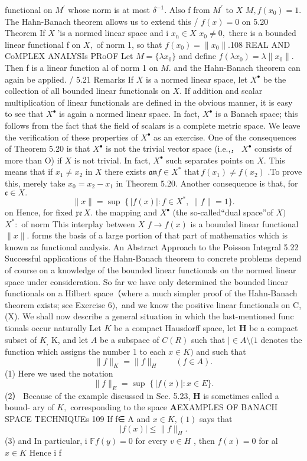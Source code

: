functional on $M^{\prime}$ whose norm is at most $\delta^{-1}.$ Also f from $M^{\prime}$ to $X$ $M,f(x_{0})=1.$ The Hahn-Banach theorem allows us to extend this / $f(x)=0$ on 5.20 Theorem If $X$ ’is a normed linear space and i $x_{\mathrm{n}}\in X$ $x_{0}\neq0,$ there is a bounded linear functional f on $X,$ of norm 1, so that $f(x_{0})=\|x_{0}\|.$108 REAL AND CoMPLEX ANALYSIs PRoOF Let $M=\{\lambda x_{0}\}$ and define $f(\lambda x_{0})=\lambda\|x_{0}\|.$ Then f is a linear function al of norm 1 on $M.$ and the Hahn-Banach theorem can again be applied. / 5.21 Remarks If $\textstyle X$ is a normed linear space, let $X^{\bullet}$ be the collection of all bounded linear functionals on $X.$ If addition and scalar multiplication of linear functionals are defined in the obvious manner, it is easy to see that $X^{\bullet}$ is again a normed linear space. In fact, $X^{\bullet}$ is a Banach space; this follows from the fact that the field of scalars is a complete metric space. We leave the verification of these properties of $X^{\bullet}$ as an exercise. One of the consequences of Theorem 5.20 is that $X^{\bullet}$ is not the trivial vector space (i.e.,， $X^{\bullet}$ consists of more than O) if $X$ is not trivial. In fact, $X^{\bullet}$ such separates points on $X.$ This means that if $x_{1}\neq x_{2}$ in $X$ there exists ${\mathfrak{a n}}f\in X^{*}$ $\mathrm{that}\,f(x_{1})\neq f(x_{2})$ .To prove this, merely take $x_{0}=x_{2}-x_{1}$ in Theorem 5.20. Another consequence is that, for ${\mathfrak{c}}\in X.$ $$ \|x\|=\operatorname*{sup}\;\{\,|f(x)|\!:f\in X^{*},\ \|f\|=1\}. $$ on Hence, for fixed ${\mathfrak{x e}}\,X.$ the mapping and $X^{\bullet}$ (the so-called“dual space”of $X)$ $X^{*}{\mathrm{:}}$ of norm This interplay between $\textstyle X$ $f\to f(x)$ is a bounded linear functional $\|x\|.$ forms the basis of a large portion of that part of mathematics which is known as functional analysis. An Abstract Approach to the Poisson Integral 5.22 Successful applications of the Hahn-Banach theorem to concrete problems depend of course on a knowledge of the bounded linear functionals on the normed linear space under consideration. So far we have only determined the bounded linear functionals on a Hilbert space（where a much simpler proof of the Hahn-Banach theorem exists; see Exercise $6),$ and we know the positive linear functionals on C,(X). We shall now describe a general situation in which the last-mentioned func tionals occur naturally Let $\textstyle K$ be a compact Hausdorff space, let ${\boldsymbol{H}}$ be a compact subset of $K_{\mathrm{{,}}}$ K, and let $\scriptstyle A$ be a subspace of $\scriptstyle C(R)$ such that $\mid\in A\setminus(1$ denotes the function which assigns the number 1 to each $x\in K)$ and such that $$ \|f\|_{K}=\|f\|_{H}\qquad(f\in A). $$ (1) Here we used the notation $$ \|f\|_{E}=\operatorname*{sup}\;\{\,|f(x)|\!:x\in E\}. $$ (2） Because of the example discussed in Sec. 5.23, ${\boldsymbol{H}}$ is sometimes called a bound- ary of $K,$ corresponding to the space ${\boldsymbol{A}}$EXAMPLES OF BANACH SPACE TECHNIQUEs 109 If f∈ A and $x\in K,(1)$ says that $$ |f(x)|\leq\|f\|_{H}. $$ (3) and In particular, i $\mathbb{F}f(y)=0$ for every $\textstyle v\in H$ , then $f(x)=0$ for al $x\in K$ Hence i f 